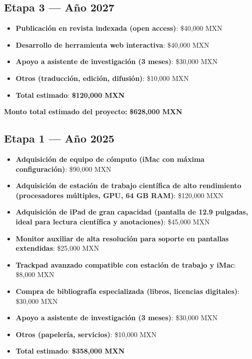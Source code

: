 \documentclass[12pt]{article}
\begin{document}
\subsection*{Etapa 3 — Año 2027}
\begin{itemize}
  \item \textbf{Publicación en revista indexada (open access)}: \$40,000 MXN
  \item \textbf{Desarrollo de herramienta web interactiva}: \$40,000 MXN
  \item \textbf{Apoyo a asistente de investigación (3 meses)}: \$30,000 MXN
  \item \textbf{Otros (traducción, edición, difusión)}: \$10,000 MXN
  \item \textbf{Total estimado}: \textbf{\$120,000 MXN}
\end{itemize}

\noindent\textbf{Monto total estimado del proyecto:} \textbf{\$628,000 MXN}


\subsection*{Etapa 1 — Año 2025}
\begin{itemize}
  \item \textbf{Adquisición de equipo de cómputo (iMac con máxima configuración)}: \$90,000 MXN
  \item \textbf{Adquisición de estación de trabajo científica de alto rendimiento (procesadores múltiples, GPU, 64 GB RAM)}: \$120,000 MXN
  \item \textbf{Adquisición de iPad de gran capacidad (pantalla de 12.9 pulgadas, ideal para lectura científica y anotaciones)}: \$45,000 MXN
  \item \textbf{Monitor auxiliar de alta resolución para soporte en pantallas extendidas}: \$25,000 MXN
  \item \textbf{Trackpad avanzado compatible con estación de trabajo y iMac}: \$8,000 MXN
  \item \textbf{Compra de bibliografía especializada (libros, licencias digitales)}: \$30,000 MXN
  \item \textbf{Apoyo a asistente de investigación (3 meses)}: \$30,000 MXN
  \item \textbf{Otros (papelería, servicios)}: \$10,000 MXN
  \item \textbf{Total estimado}: \textbf{\$358,000 MXN}
\end{itemize}
\end{document}
